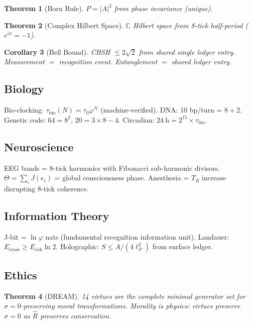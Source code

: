 \documentclass[12pt,a4paper]{article}
\newtheorem{theorem}{Theorem}[section]
\newtheorem{corollary}[theorem]{Corollary}
\theoremstyle{definition}
\theoremstyle{remark}
\begin{document}
\begin{theorem}[Born Rule]
$P = |A|^2$ from phase invariance (unique).
\end{theorem}

\begin{theorem}[Complex Hilbert Space]
$\mathbb{C}$ Hilbert space from 8-tick half-period ($e^{i\pi} = -1$).
\end{theorem}

\begin{corollary}[Bell Bound]
CHSH $\leq 2\sqrt{2}$ from shared single ledger entry.
Measurement $=$ recognition event. Entanglement $=$ shared ledger entry.
\end{corollary}

\subsection{Biology}

Bio-clocking: $\tau_\mathrm{bio}(N) = \tau_0\varphi^N$ (machine-verified).
DNA: 10 bp/turn = $8 + 2$.
Genetic code: $64 = 8^2$, $20 = 3\times 8 - 4$.
Circadian: $24~\mathrm{h} = 2^{15}\times\tau_\mathrm{bio}$.

\subsection{Neuroscience}

EEG bands = 8-tick harmonics with Fibonacci sub-harmonic divisors.
$\Theta = \sum_i J(e_i)$ = global consciousness phase.
Anesthesia = $T_R$ increase disrupting 8-tick coherence.

\subsection{Information Theory}

J-bit = $\ln\varphi$ nats (fundamental recognition information unit).
Landauer: $E_\mathrm{erase} \geq E_\mathrm{coh}\ln 2$.
Holographic: $S \leq A/(4\ell_P^2)$ from surface ledger.

\subsection{Ethics}

\begin{theorem}[DREAM]
14 virtues are the complete minimal generator 
set for $\sigma = 0$-preserving moral transformations.
Morality is physics: virtues preserve $\sigma = 0$ as $\hat{R}$ preserves conservation.
\end{theorem}
\end{document}
